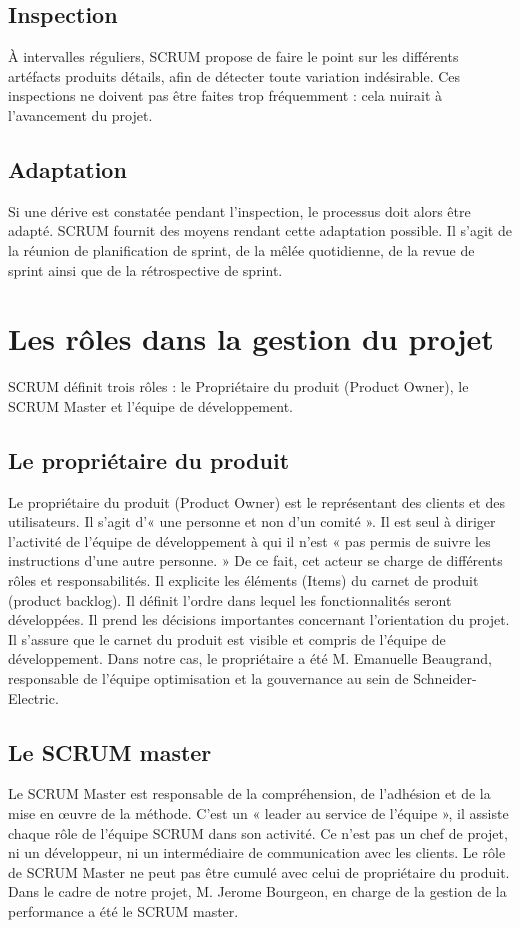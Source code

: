 \documentclass[a4paper,12pt]{book}
\theoremstyle{break}
\begin{document}
\subsection{Inspection}
À intervalles réguliers, SCRUM propose de faire le point sur les différents artéfacts produits détails, afin de détecter toute variation indésirable. Ces inspections ne doivent pas être faites trop fréquemment : cela nuirait à l'avancement du projet.


\subsection{Adaptation}
Si une dérive est constatée pendant l'inspection, le processus doit alors être adapté. SCRUM fournit des moyens rendant cette adaptation possible. Il s'agit de la réunion de planification de sprint, de la mêlée quotidienne, de la revue de sprint ainsi que de la rétrospective de sprint.

\section{Les rôles dans la gestion du projet}
SCRUM définit trois rôles : le Propriétaire du produit (Product Owner), le SCRUM Master et l’équipe de développement.

\subsection{Le propriétaire du produit}
Le propriétaire du produit (Product Owner) est le représentant des clients et des utilisateurs. Il s'agit d'« une personne et non d'un comité ». Il est seul à diriger l'activité de l'équipe de développement à qui il n'est « pas permis de suivre les instructions d'une autre personne. »
De ce fait, cet acteur se charge de différents rôles et responsabilités. Il explicite les éléments (Items) du carnet de produit (product backlog). Il définit l'ordre dans lequel les fonctionnalités seront développées. Il prend les décisions importantes concernant l'orientation du projet. Il s'assure que le carnet du produit est visible et compris de l'équipe de développement.
Dans notre cas, le propriétaire a été M. Emanuelle Beaugrand, responsable de l'équipe optimisation et la gouvernance au sein de Schneider-Electric.

\subsection{Le SCRUM master}
Le SCRUM Master est responsable de la compréhension, de l'adhésion et de la mise en œuvre de la méthode. C'est un « leader au service de l'équipe », il assiste chaque rôle de l'équipe SCRUM dans son activité. Ce n'est pas un chef de projet, ni un développeur, ni un intermédiaire de communication avec les clients. Le rôle de SCRUM Master ne peut pas être cumulé avec celui de propriétaire du produit.
Dans le cadre de notre projet, M. Jerome Bourgeon, en charge de la gestion de la performance a été le SCRUM master.
\end{document}
